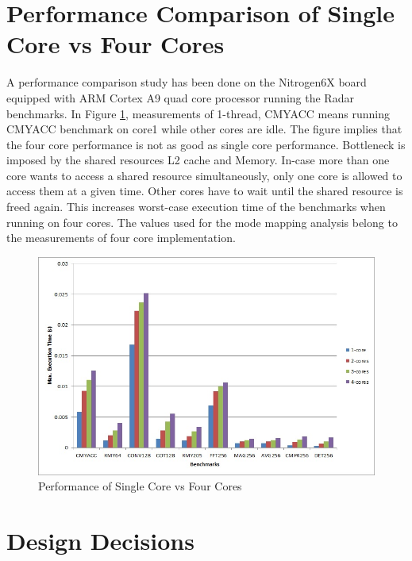 \section{Performance Comparison of Single Core vs Four Cores}
\label{sec:mm:perf_comp}
A performance comparison study has been done on the Nitrogen6X board equipped with ARM Cortex A9 quad core processor running the Radar benchmarks. In Figure \ref{fig:mm:1core_4core}, measurements of 1-thread, CMYACC means running CMYACC benchmark on core1 while other cores are idle. The figure implies that the four core performance is not as good as single core performance. Bottleneck is imposed by the shared resources L2 cache and Memory. In-case more than one core wants to access a shared resource simultaneously, only one core is allowed to access them at a given time. Other cores have to wait until the shared resource is freed again. This increases worst-case execution time of the benchmarks when running on four cores. The values used for the mode mapping analysis belong to the measurements of four core implementation.

\begin{figure}[h!]
	\centering
	\includegraphics[width=140mm]{figures/1core_4core}
	\caption{Performance of Single Core vs Four Cores}
	\label{fig:mm:1core_4core}
\end{figure}


\clearpage
\section{Design Decisions}
\label{mm:design_decisions}

